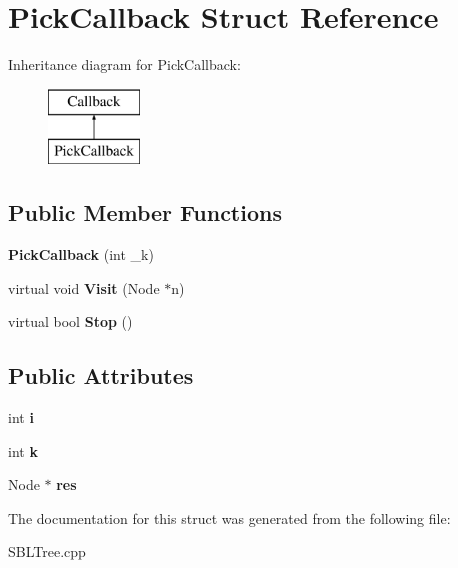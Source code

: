 \section{Pick\+Callback Struct Reference}
\label{structPickCallback}
Inheritance diagram for Pick\+Callback\+:\begin{figure}[H]
\begin{center}
\leavevmode
\includegraphics[height=2.000000cm]{structPickCallback}
\end{center}
\end{figure}
\subsection*{Public Member Functions}
\begin{DoxyCompactItemize}
\item 
{\bfseries Pick\+Callback} (int \+\_\+k)\label{structPickCallback_af50fca53a56421d636f3d9b3a5de31cf}

\item 
virtual void {\bfseries Visit} (Node $\ast$n)\label{structPickCallback_a8f88f99820d6dd469fc6c8f97f14bfc7}

\item 
virtual bool {\bfseries Stop} ()\label{structPickCallback_a71d8b7e130a62cf53abd8d3d08f7d784}

\end{DoxyCompactItemize}
\subsection*{Public Attributes}
\begin{DoxyCompactItemize}
\item 
int {\bfseries i}\label{structPickCallback_aeb2d83f851d851183c61f85eb7392f9b}

\item 
int {\bfseries k}\label{structPickCallback_a38f80e9d72a8f2f47830088d15ea2d12}

\item 
Node $\ast$ {\bfseries res}\label{structPickCallback_a25ec700b1ce1a91c7912469afd08206a}

\end{DoxyCompactItemize}


The documentation for this struct was generated from the following file\+:\begin{DoxyCompactItemize}
\item 
S\+B\+L\+Tree.\+cpp\end{DoxyCompactItemize}
